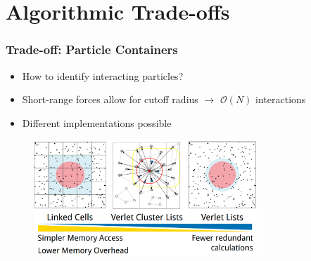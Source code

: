 \documentclass[
	10pt,
	t		%
]{beamer}
\begin{document}
\section{Algorithmic Trade-offs}

\begin{frame}
    \frametitle{Trade-off: Particle Containers}

    \begin{itemize}
        \item How to identify interacting particles?
        \item Short-range forces allow for cutoff radius $\rightarrow$ $\mathcal{O}(N)$ interactions
        \item Different implementations possible
    \end{itemize}

    \vspace{0.2cm}
    \begin{figure}
        \centering
        \includegraphics[width=0.75\textwidth]{figures/particle_containers.png}
        \caption{\small{
                \cite{SIAM_PP24}}}
    \end{figure}

\end{frame}




\end{document}
